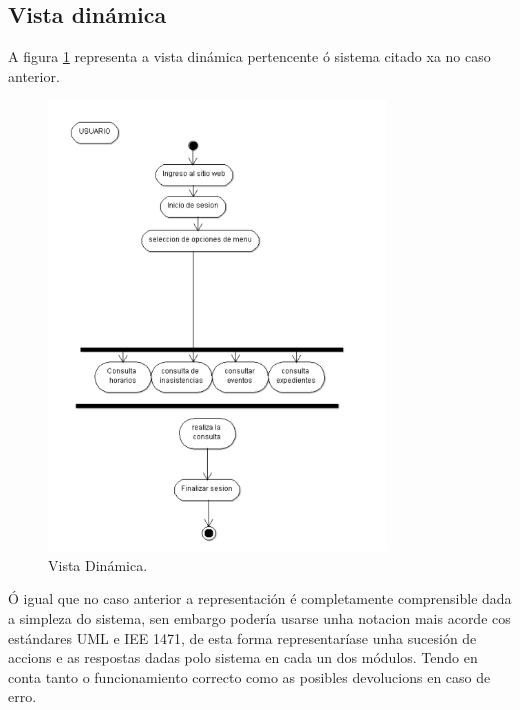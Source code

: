 \documentclass[DIV=calc,paper=a4,fontsize=11pt,onecolumn]{scrartcl}	 %
\begin{document}
\subsection{Vista dinámica}
A figura \ref{fig:dinMal} representa a vista dinámica pertencente ó sistema citado xa no caso anterior.\cite{UETD}
\begin{figure}[!h]
\centering
\includegraphics[width = 0.8\textwidth]{./figuras/dinamicaMal.png}
\caption{Vista Dinámica.}
\label{fig:dinMal}
\end{figure}

Ó igual que no caso anterior a representación é completamente comprensible dada a simpleza do sistema, sen embargo podería usarse unha notacion mais acorde cos estándares UML e IEE 1471, de esta forma representaríase unha sucesión de accions e as respostas dadas polo sistema en cada un dos módulos. Tendo en conta tanto o funcionamiento correcto como as posibles devolucions en caso de erro.
\end{document}
